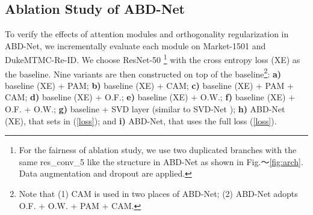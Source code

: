 \documentclass[10pt,twocolumn]{article}
\begin{document}
\subsection{Ablation Study of ABD-Net}
To verify the effects of attention modules and orthogonality regularization in ABD-Net, we incrementally evaluate each module on Market-1501 and DukeMTMC-Re-ID. We choose ResNet-50 \footnote{For the fairness of ablation study, we use two duplicated branches with the same res\_conv\_5 like the structure in ABD-Net as shown in Fig.～\ref{fig:arch}. Data augmentation and dropout are applied.} with the cross entropy loss (XE) as the baseline. 
Nine variants are then constructed on top of the baseline\footnote{Note that (1) CAM is used in two places of ABD-Net; (2) ABD-Net adopts O.F. + O.W. + PAM + CAM.}: \textbf{a)} baseline (XE) + PAM; \textbf{b)} baseline (XE) + CAM; \textbf{c)} baseline (XE) + PAM + CAM; \textbf{d)} baseline (XE) + O.F.; \textbf{e)} baseline (XE) + O.W.; \textbf{f)} baseline  (XE) + O.F. + O.W.; \textbf{g)} baseline + SVD layer (similar to SVD-Net \cite{Sun_2017}); \textbf{h)} ABD-Net (XE), that sets  in (\ref{loss}); and \textbf{i)} ABD-Net, that uses the full loss (\ref{loss}).



\begin{table}[ht]
\begin{center}
\caption{Ablation Study of ABD-Net on Market-1501. O.F. and O.W.: Orthogonality Regularization on Features and Weights; PAM and CAM: Position and Channel Attention Modules.}
\vspace{0.5em}
\label{table:ablation}
\end{center}
\vspace{-5mm}
\end{table}
\end{document}
